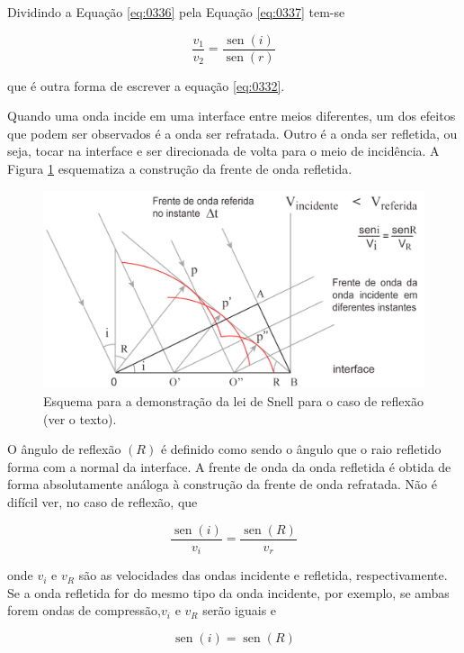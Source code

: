 \documentclass[]{book}
\theoremstyle{definition}
\theoremstyle{definition}
\theoremstyle{definition}
\theoremstyle{remark}
\begin{document}
Dividindo a Equação \eqref{eq:0336} pela Equação \eqref{eq:0337} tem-se

\begin{equation}
\frac{v_{1}}{v_{2}}=\frac{\operatorname{sen}(i)}{\operatorname{sen}(r)}  \label{eq:0338}
\end{equation}

que é outra forma de escrever a equação \eqref{eq:0332}.

Quando uma onda incide em uma interface entre meios diferentes, um dos efeitos que podem ser observados é a onda ser refratada. Outro é a onda ser refletida, ou seja, tocar na interface e ser direcionada de volta para o meio de incidência. A Figura \ref{fig:usp0409} esquematiza a construção da frente de onda refletida.

\begin{figure}

{\centering \includegraphics[width=0.5\linewidth]{fig/figU09} 

}

\caption{Esquema para a demonstração da lei de Snell para o caso de reflexão (ver o texto).}\label{fig:usp0409}
\end{figure}

O ângulo de reflexão \((R)\) é definido como sendo o ângulo que o raio refletido forma com a normal da interface. A frente de onda da onda refletida é obtida de forma absolutamente análoga à construção da frente de onda refratada. Não é difícil ver, no caso de reflexão, que

\begin{equation}
\frac{\operatorname{sen}(i)}{v_{i}}=\frac{\operatorname{sen}(R)}{v_{r}} \label{eq:0339}
\end{equation}

onde \(v_i\) e \(v_R\) são as velocidades das ondas incidente e refletida, respectivamente. Se a onda refletida for do mesmo tipo da onda incidente, por exemplo, se ambas forem ondas de compressão,\(v_i\) e \(v_R\) serão iguais e

\begin{equation}
\operatorname{sen}(i)=\operatorname{sen}(R) \label{eq:0340}
\end{equation}
\end{document}
